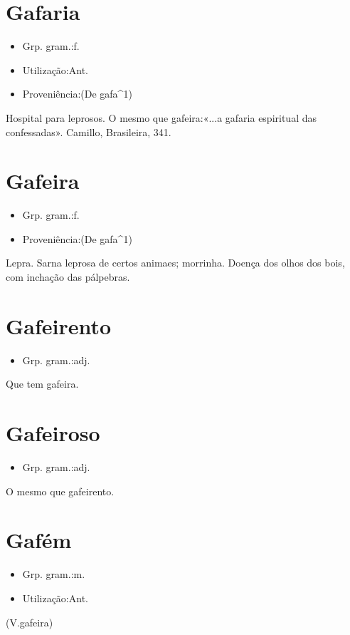 \section{Gafaria}
\begin{itemize}
\item {Grp. gram.:f.}
\end{itemize}
\begin{itemize}
\item {Utilização:Ant.}
\end{itemize}
\begin{itemize}
\item {Proveniência:(De \textunderscore gafa\textunderscore ^1)}
\end{itemize}
Hospital para leprosos.
O mesmo que \textunderscore gafeira\textunderscore :«\textunderscore ...a gafaria espiritual das confessadas\textunderscore ». Camillo, \textunderscore Brasileira\textunderscore , 341.
\section{Gafeira}
\begin{itemize}
\item {Grp. gram.:f.}
\end{itemize}
\begin{itemize}
\item {Proveniência:(De \textunderscore gafa\textunderscore ^1)}
\end{itemize}
Lepra.
Sarna leprosa de certos animaes; morrinha.
Doença dos olhos dos bois, com inchação das pálpebras.
\section{Gafeirento}
\begin{itemize}
\item {Grp. gram.:adj.}
\end{itemize}
Que tem gafeira.
\section{Gafeiroso}
\begin{itemize}
\item {Grp. gram.:adj.}
\end{itemize}
O mesmo que \textunderscore gafeirento\textunderscore .
\section{Gafém}
\begin{itemize}
\item {Grp. gram.:m.}
\end{itemize}
\begin{itemize}
\item {Utilização:Ant.}
\end{itemize}
(V.gafeira)
